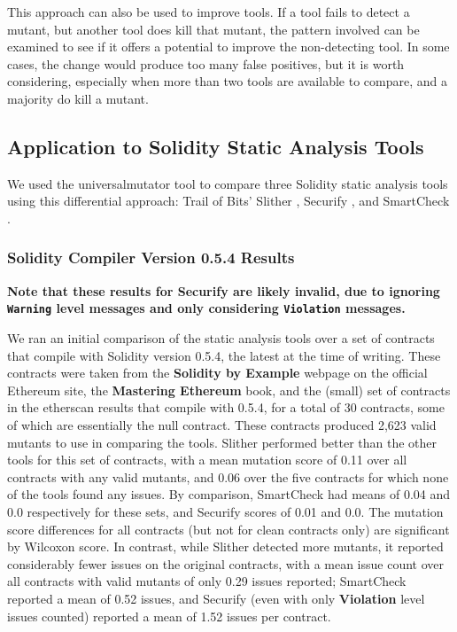 \documentclass{article}
\begin{document}
This approach can also be used to improve tools.  If a tool fails to detect a mutant, but another tool does kill that mutant, the pattern involved can be examined to see if it offers a potential to improve the non-detecting tool.  In some cases, the change would produce too many false positives, but it is worth considering, especially when more than two tools are available to compare, and a majority do kill a mutant.

\subsection{Application to Solidity Static Analysis Tools}

We used the universalmutator tool \cite{universalmutator,regexpMut} to compare three Solidity static analysis tools using this differential approach: Trail of Bits' Slither \cite{slither}, Securify \cite{securify}, and SmartCheck \cite{smartcheck}.

\subsubsection{Solidity Compiler Version 0.5.4 Results}

{\bf Note that these results for Securify are likely invalid, due to ignoring {\tt Warning} level messages and only considering {\tt Violation} messages.}

We ran an initial comparison of the static analysis tools over a set of contracts that compile with Solidity version 0.5.4, the latest at the time of writing.  These contracts were taken from the {\bf Solidity by Example} webpage on the official Ethereum site, the {\bf Mastering Ethereum} book, and the (small) set of contracts in the etherscan results that compile with 0.5.4, for a total of 30 contracts, some of which are essentially the null contract.  These contracts produced 2,623 valid mutants to use in comparing the tools.  Slither performed better than the other tools for this set of contracts, with a mean mutation score of 0.11 over all contracts with any valid mutants, and 0.06 over the five contracts for which none of the tools found any issues.  By comparison, SmartCheck had means of 0.04 and 0.0 respectively for these sets, and Securify scores of 0.01 and 0.0.  The mutation score differences for all contracts (but not for clean contracts only) are significant by Wilcoxon score.  In contrast, while Slither detected more mutants, it reported considerably fewer issues on the original contracts, with a mean issue count over all contracts with valid mutants of only 0.29 issues reported; SmartCheck reported a mean of 0.52 issues, and Securify (even with only {\bf Violation} level issues counted) reported a mean of 1.52 issues per contract.
\end{document}
